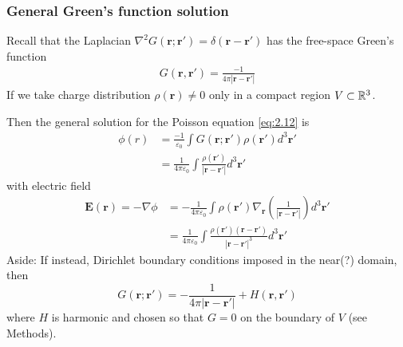 \documentclass[a4paper]{article}
\begin{document}
\subsubsection{General Green's function solution}
Recall that the Laplacian $\nabla^2 G(\mathbf{r};\mathbf{r}') = \delta(\mathbf{r}-\mathbf{r}')$ has the free-space Green's function
\begin{equation*}\tag{2.19} \label{eq:2.19}
\begin{aligned}
G(\mathbf{r},\mathbf{r}') = \frac{-1}{4\pi |\mathbf{r}-\mathbf{r'}|}
\end{aligned}
\end{equation*}
If we take charge distribution $\rho(\mathbf{r}) \neq 0$ only in a compact region $V \subset \mathbb{R}^3$.

Then the general solution for the Poisson equation \eqref{eq:2.12} is
\begin{equation*}\tag{2.20} \label{eq:2.20}
\begin{aligned}
\phi(r) &= \frac{-1}{\varepsilon_0} \int G(\mathbf{r};\mathbf{r'}) \rho(\mathbf{r'}) d^3 \mathbf{r}'\\
&= \frac{1}{4\pi \varepsilon_0} \int \frac{\rho(\mathbf{r'})}{|\mathbf{r}-\mathbf{r'}|} d^3 \mathbf{r'}
\end{aligned}
\end{equation*}
with electric field
\begin{equation*}\tag{2.21} \label{eq:2.21}
\begin{aligned}
\mathbf{E}(\mathbf{r}) = -\nabla \phi &= -\frac{1}{4\pi\varepsilon_0} \int \rho(\mathbf{r'})\nabla_\mathbf{r} \left(\frac{1}{|\mathbf{r}-\mathbf{r'}|}\right) d^3 \mathbf{r'}\\
&=\frac{1}{4\pi \varepsilon_0} \int \frac{\rho(\mathbf{r'}) (\mathbf{r}-\mathbf{r'})}{|\mathbf{r}-\mathbf{r'}|^3}d^3 \mathbf{r'}
\end{aligned}
\end{equation*}
Aside: If instead, Dirichlet boundary conditions imposed in the near(?) domain, then $$G(\mathbf{r};\mathbf{r'}) = -\frac{1}{4\pi |\mathbf{r}-\mathbf{r'}|} + H(\mathbf{r},\mathbf{r'})$$ where $H$ is harmonic and chosen so that $G=0$ on the boundary of $V$ (see Methods).
\end{document}
